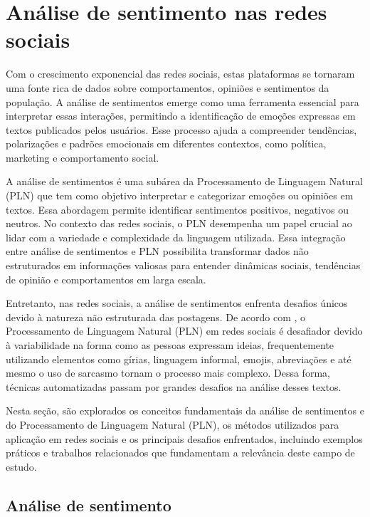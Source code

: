 \documentclass[
	12pt,				%
	oneside,			%
	a4paper,			%
	english,			%
	french,				%
	spanish,			%
	brazil				%
	]{abntex2}
\begin{document}
\hypertarget{anuxe1lise-de-sentimento-nas-redes-sociais}{%
\section{Análise de sentimento nas redes
sociais}\label{anuxe1lise-de-sentimento-nas-redes-sociais}}

Com o crescimento exponencial das redes sociais, estas plataformas se
tornaram uma fonte rica de dados sobre comportamentos, opiniões e
sentimentos da população. A análise de sentimentos emerge como uma
ferramenta essencial para interpretar essas interações, permitindo a
identificação de emoções expressas em textos publicados pelos usuários.
Esse processo ajuda a compreender tendências, polarizações e padrões
emocionais em diferentes contextos, como política, marketing e
comportamento social.

A análise de sentimentos é uma subárea da Processamento de Linguagem
Natural (PLN) que tem como objetivo interpretar e categorizar emoções ou
opiniões em textos. Essa abordagem permite identificar sentimentos
positivos, negativos ou neutros. No contexto das redes sociais, o PLN
desempenha um papel crucial ao lidar com a variedade e complexidade da
linguagem utilizada. Essa integração entre análise de sentimentos e PLN
possibilita transformar dados não estruturados em informações valiosas
para entender dinâmicas sociais, tendências de opinião e comportamentos
em larga escala.

Entretanto, nas redes sociais, a análise de sentimentos enfrenta
desafios únicos devido à natureza não estruturada das postagens. De
acordo com , o Processamento de
Linguagem Natural (PLN) em redes sociais é desafiador devido à
variabilidade na forma como as pessoas expressam ideias, frequentemente
utilizando elementos como gírias, linguagem informal, emojis,
abreviações e até mesmo o uso de sarcasmo tornam o processo mais
complexo. Dessa forma, técnicas automatizadas passam por grandes
desafios na análise desses textos.

Nesta seção, são explorados os conceitos fundamentais da análise de
sentimentos e do Processamento de Linguagem Natural (PLN), os métodos
utilizados para aplicação em redes sociais e os principais desafios
enfrentados, incluindo exemplos práticos e trabalhos relacionados que
fundamentam a relevância deste campo de estudo.

\hypertarget{anuxe1lise-de-sentimento}{%
\subsection{Análise de sentimento}\label{anuxe1lise-de-sentimento}}
\end{document}
